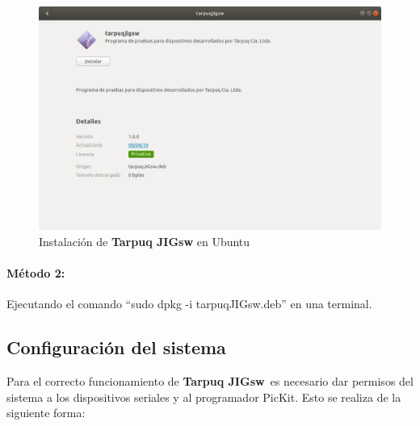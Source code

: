 \documentclass[a4paper,12pt]{refart}
\newcommand\tarpuqJIGsw{\textbf{Tarpuq JIGsw}}
\begin{document}
\begin{figure}[H]\centering
\includegraphics[width=\textwidth, frame]{images/install_ubuntu}
\caption{Instalación de \tarpuqJIGsw{} en Ubuntu}
\label{fig:installDeb}
\end{figure}

\paragraph{Método 2:}
Ejecutando el comando ``sudo dpkg -i tarpuqJIGsw.deb'' en una terminal.

\subsection{Configuración del sistema}\label{ref:sysConfig}
Para el correcto funcionamiento de \tarpuqJIGsw\, es necesario dar permisos del sistema a los dispositivos seriales y al programador PicKit. Esto se realiza de la siguiente forma:
\end{document}
